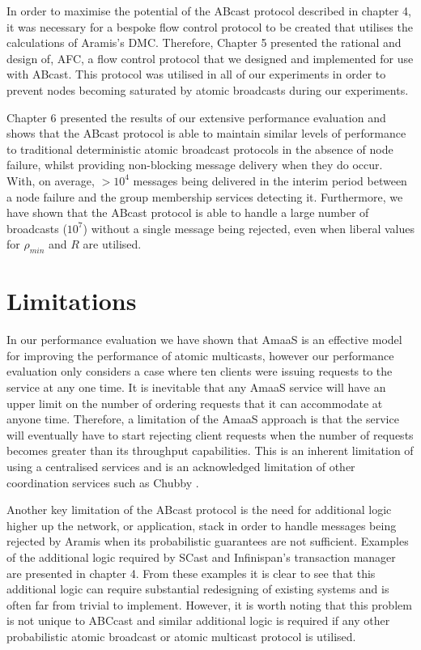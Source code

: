 In order to maximise the potential of the \textsf{ABcast} protocol described in chapter 4, it was necessary for a bespoke flow control protocol to be created that utilises the calculations of \textsf{Aramis}'s DMC.  Therefore, Chapter 5 presented the rational and design of, \textsf{AFC}, a flow control protocol that we designed and implemented for use with \textsf{ABcast}.  This protocol was utilised in all of our experiments in order to prevent nodes becoming saturated by atomic broadcasts during our experiments.  

Chapter 6 presented the results of our extensive performance evaluation and shows that the \textsf{ABcast} protocol is able to maintain similar levels of performance to traditional deterministic atomic broadcast protocols in the absence of node failure, whilst providing non-blocking message delivery when they do occur.  With, on average, $> 10^4$ messages being delivered in the interim period between a node failure and the group membership services detecting it.  Furthermore, we have shown that the \textsf{ABcast} protocol is able to handle a large number of broadcasts ($10^7$) without a single message being rejected, even when liberal values for $\rho_{min}$ and $R$ are utilised.  

\section{Limitations}\label{sec:sum_limitations}
In our performance evaluation we have shown that \textsf{AmaaS} is an effective model for improving the performance of atomic multicasts, however our performance evaluation only considers a case where ten clients were issuing requests to the service at any one time.  It is inevitable that any \textsf{AmaaS} service will have an upper limit on the number of ordering requests that it can accommodate at anyone time.  Therefore, a limitation of the \textsf{AmaaS} approach is that the service will eventually have to start rejecting client requests when the number of requests becomes greater than its throughput capabilities.  This is an inherent limitation of using a centralised services and is an acknowledged limitation of other coordination services such as Chubby \citep{Burrows:2006:CLS:1298455.1298487}.  

Another key limitation of the \textsf{ABcast} protocol is the need for additional logic higher up the network, or application, stack in order to handle messages being rejected by \textsf{Aramis} when its probabilistic guarantees are not sufficient.  Examples of the additional logic required by \textsf{SCast} and Infinispan's transaction manager are presented in chapter 4.  From these examples it is clear to see that this additional logic can require substantial redesigning of existing systems and is often far from trivial to implement.  However, it is worth noting that this problem is not unique to \textsf{ABCcast} and similar additional logic is required if any other probabilistic atomic broadcast or atomic multicast protocol is utilised.  


